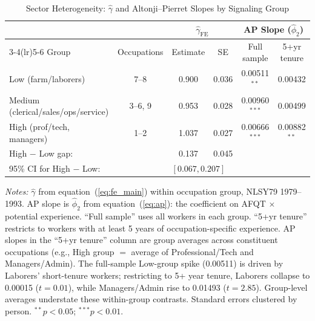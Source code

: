 \documentclass[12pt]{article}
\theoremstyle{definition}
\theoremstyle{remark}
\begin{document}
\begin{table}[htbp]
\centering
\caption{Sector Heterogeneity: $\hat{\gamma}$ and Altonji--Pierret Slopes by Signaling Group}
\label{tab:sector}
\begin{threeparttable}
\small
\setlength{\tabcolsep}{5pt}
\begin{tabular}{lccccc}
\toprule
 & & \multicolumn{2}{c}{$\hat{\gamma}_{\text{FE}}$} & \multicolumn{2}{c}{AP Slope ($\hat{\phi}_2$)} \\
\cmidrule(lr){3-4}\cmidrule(lr){5-6}
Group & Occupations & Estimate & SE & Full sample & 5+yr tenure \\
\midrule
Low (farm/laborers) & 7--8 & 0.900 & 0.036 & 0.00511$^{**}$ & 0.00432 \\
Medium (clerical/sales/ops/service) & 3--6, 9 & 0.953 & 0.028 & 0.00960$^{***}$ & 0.00499 \\
High (prof/tech, managers) & 1--2 & 1.037 & 0.027 & 0.00666$^{***}$ & 0.00882$^{**}$ \\
\midrule
\multicolumn{2}{l}{High $-$ Low gap:} & 0.137 & 0.045 & & \\
\multicolumn{2}{l}{95\% CI for High $-$ Low:} & \multicolumn{2}{l}{$[0.067, 0.207]$} & & \\
\bottomrule
\end{tabular}
\begin{tablenotes}
\small
\item \textit{Notes:} $\hat{\gamma}$ from equation~(\ref{eq:fe_main}) within occupation group,
NLSY79 1979--1993. AP slope is $\hat{\phi}_2$ from equation~(\ref{eq:ap}): the coefficient
on AFQT $\times$ potential experience. ``Full sample'' uses all workers in each group.
``5+yr tenure'' restricts to workers with at least 5 years of occupation-specific experience.
AP slopes in the ``5+yr tenure'' column are group averages across constituent occupations
(e.g., High group $= $ average of Professional/Tech and Managers/Admin). The full-sample
Low-group spike (0.00511) is driven by Laborers' short-tenure workers; restricting to
5+ year tenure, Laborers collapse to 0.00015 ($t = 0.01$), while Managers/Admin rise to
0.01493 ($t = 2.85$). Group-level averages understate these within-group contrasts.
Standard errors clustered by person. $^{**} p < 0.05$; $^{***} p < 0.01$.
\end{tablenotes}
\end{threeparttable}
\end{table}
\end{document}
